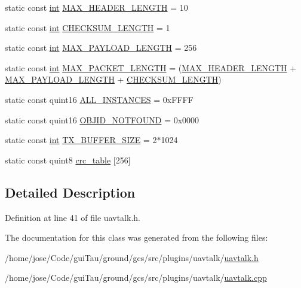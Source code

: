 \begin{DoxyCompactItemize}
\item 
static const \hyperlink{ioapi_8h_a787fa3cf048117ba7123753c1e74fcd6}{int} \hyperlink{group___u_a_v_talk_plugin_ga279763a8abdcb2fae7cb36916b36c1a8}{M\-A\-X\-\_\-\-H\-E\-A\-D\-E\-R\-\_\-\-L\-E\-N\-G\-T\-H} = 10
\item 
static const \hyperlink{ioapi_8h_a787fa3cf048117ba7123753c1e74fcd6}{int} \hyperlink{group___u_a_v_talk_plugin_ga094abac2d747f187a4b22bea1dd28ec0}{C\-H\-E\-C\-K\-S\-U\-M\-\_\-\-L\-E\-N\-G\-T\-H} = 1
\item 
static const \hyperlink{ioapi_8h_a787fa3cf048117ba7123753c1e74fcd6}{int} \hyperlink{group___u_a_v_talk_plugin_gac89ca6073b8cf1479a5e2468b3691db9}{M\-A\-X\-\_\-\-P\-A\-Y\-L\-O\-A\-D\-\_\-\-L\-E\-N\-G\-T\-H} = 256
\item 
static const \hyperlink{ioapi_8h_a787fa3cf048117ba7123753c1e74fcd6}{int} \hyperlink{group___u_a_v_talk_plugin_gab5a37286c5e8b676d49e134f26444a0c}{M\-A\-X\-\_\-\-P\-A\-C\-K\-E\-T\-\_\-\-L\-E\-N\-G\-T\-H} = (\hyperlink{group___u_a_v_talk_plugin_ga279763a8abdcb2fae7cb36916b36c1a8}{M\-A\-X\-\_\-\-H\-E\-A\-D\-E\-R\-\_\-\-L\-E\-N\-G\-T\-H} + \hyperlink{group___u_a_v_talk_plugin_gac89ca6073b8cf1479a5e2468b3691db9}{M\-A\-X\-\_\-\-P\-A\-Y\-L\-O\-A\-D\-\_\-\-L\-E\-N\-G\-T\-H} + \hyperlink{group___u_a_v_talk_plugin_ga094abac2d747f187a4b22bea1dd28ec0}{C\-H\-E\-C\-K\-S\-U\-M\-\_\-\-L\-E\-N\-G\-T\-H})
\item 
static const quint16 \hyperlink{group___u_a_v_talk_plugin_ga71e922ea4fa7f9e0a9fe89ebdd2fe75c}{A\-L\-L\-\_\-\-I\-N\-S\-T\-A\-N\-C\-E\-S} = 0x\-F\-F\-F\-F
\item 
static const quint16 \hyperlink{group___u_a_v_talk_plugin_gaa627c86aec4d382c9744541688fb66ef}{O\-B\-J\-I\-D\-\_\-\-N\-O\-T\-F\-O\-U\-N\-D} = 0x0000
\item 
static const \hyperlink{ioapi_8h_a787fa3cf048117ba7123753c1e74fcd6}{int} \hyperlink{group___u_a_v_talk_plugin_gaa84c0f2f2a83872a6f82f00969d9ddff}{T\-X\-\_\-\-B\-U\-F\-F\-E\-R\-\_\-\-S\-I\-Z\-E} = 2$\ast$1024
\item 
static const quint8 \hyperlink{group___u_a_v_talk_plugin_gac5c5c810a2edb31ed325bf2d54e1b289}{crc\-\_\-table} \mbox{[}256\mbox{]}
\end{DoxyCompactItemize}


\subsection{Detailed Description}


Definition at line 41 of file uavtalk.\-h.



The documentation for this class was generated from the following files\-:\begin{DoxyCompactItemize}
\item 
/home/jose/\-Code/gui\-Tau/ground/gcs/src/plugins/uavtalk/\hyperlink{uavtalk_8h}{uavtalk.\-h}\item 
/home/jose/\-Code/gui\-Tau/ground/gcs/src/plugins/uavtalk/\hyperlink{uavtalk_8cpp}{uavtalk.\-cpp}\end{DoxyCompactItemize}
